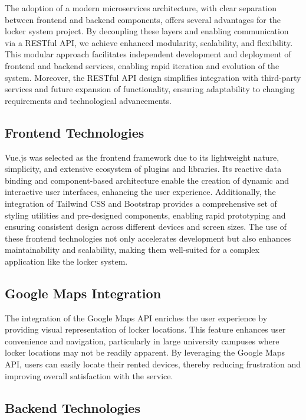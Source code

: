 The adoption of a modern microservices architecture, with clear separation between
frontend and backend components, offers several advantages for the locker system project.
By decoupling these layers and enabling communication via a RESTful API, we achieve enhanced
modularity, scalability, and flexibility. This modular approach facilitates
independent development and deployment of frontend and backend services, enabling
rapid iteration and evolution of the system. Moreover, the RESTful API design simplifies
integration with third-party services and future expansion of functionality, ensuring
adaptability to changing requirements and technological advancements.

\subsection{Frontend Technologies}

Vue.js was selected as the frontend framework due to its lightweight nature, simplicity,
and extensive ecosystem of plugins and libraries. Its reactive data binding and component-based
architecture enable the creation of dynamic and interactive user interfaces, enhancing
the user experience. Additionally, the integration of Tailwind CSS and Bootstrap provides
a comprehensive set of styling utilities and pre-designed components, enabling rapid
prototyping and ensuring consistent design across different devices and screen sizes.
The use of these frontend technologies not only accelerates development but also enhances
maintainability and scalability, making them well-suited for a complex application like
the locker system.

\subsection{Google Maps Integration}

The integration of the Google Maps API enriches the user experience by providing visual
representation of locker locations. This feature enhances user convenience and navigation,
particularly in large university campuses where locker locations may not be readily apparent.
By leveraging the Google Maps API, users can easily locate their rented devices, thereby
reducing frustration and improving overall satisfaction with the service.

\subsection{Backend Technologies}

